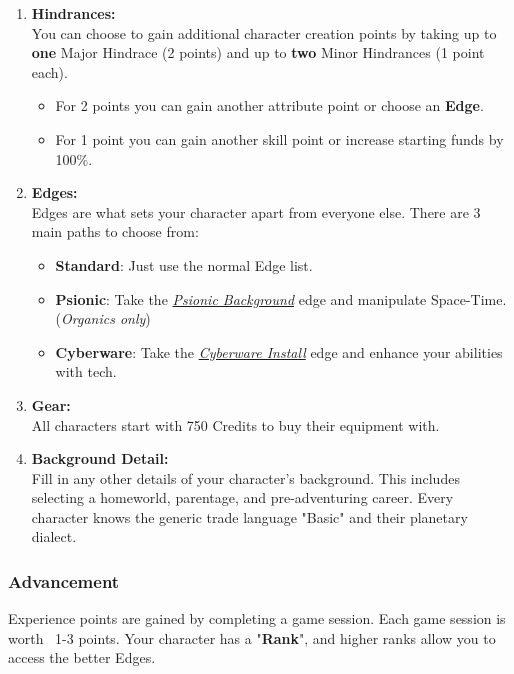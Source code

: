 \begin{enumerate}
  \item \textbf{Hindrances:}\\ You can choose to gain additional character creation points by taking up to \textbf{one} Major Hindrace (2 points) and up to \textbf{two} Minor Hindrances (1 point each).
    \begin{itemize}
        \item For 2 points you can gain another attribute point or choose an \textbf{Edge}.
        \item For 1 point you can gain another skill point or increase starting funds by 100\%.
    \end{itemize}

  \item \textbf{Edges:}\\ Edges are what sets your character apart from everyone else. There are 3 main paths to choose from:
    \begin{itemize}
        \item \textbf{Standard}: Just use the normal Edge list.
        \item \textbf{Psionic}: Take the \textit{\hyperref[sec:psionics]{Psionic Background}} edge and manipulate Space-Time. (\textit{Organics only})
        \item \textbf{Cyberware}: Take the \textit{\hyperref[sec:cyberware]{Cyberware Install}} edge and enhance your abilities with tech.
    \end{itemize}

  \item \textbf{Gear:}\\ All characters start with 750 Credits to buy their equipment with.

  \item \textbf{Background Detail:}\\ Fill in any other details of your character's background. This includes selecting a homeworld, parentage, and pre-adventuring career. Every character knows the generic trade language "Basic" and their planetary dialect.
  
\end{enumerate}

\subsubsection{Advancement}

Experience points are gained by completing a game session. Each game session is worth ~1-3 points. Your character has a "\textbf{Rank}", and higher ranks allow you to access the better Edges.

